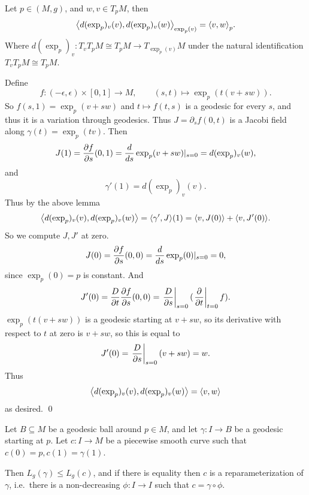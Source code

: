     Let $p\in(M,g)$, and $w,v\in T_pM$, then
    $$ \mathopen{}\mathclose{\left<d(\exp_p)_v(v),d(\exp_p)_v(w)\right>}_{\exp_p(v)} = \mathopen{}\mathclose{\left<v,w\right>}_p . $$
    Where $d(\exp_p)_v\colon T_vT_pM\cong T_pM\to T_{\exp_p(v)}M$ under the natural identification $T_vT_pM\cong T_pM$.

\elemm

\bproof

    Define
    $$ f\colon(-\epsilon,\epsilon)\times[0,1] \to M,\qquad (s,t)\mapsto\exp_p(t(v+sw)) . $$
    So $f(s,1)=\exp_p(v+sw)$ and $t\mapsto f(t,s)$ is a geodesic for every $s$, and thus it is a variation through geodesics.
    Thus $J=\partial_sf(0,t)$ is a Jacobi field along $\gamma(t)=\exp_p(tv)$.
    Then
    $$ J(1) = {{\partial f}\over{\partial s}}(0,1) = {{d}\over{ds}}\exp_p(v+sw)|_{s=0} = d(\exp_p)_v(w) , $$
    and
    $$ \gamma'(1) = d(\exp_p)_v(v) . $$
    Thus by the above lemma
    $$ \mathopen{}\mathclose{\left<d(\exp_p)_v(v),d(\exp_p)_v(w)\right>} = \mathopen{}\mathclose{\left<\gamma',J\right>}(1) = \mathopen{}\mathclose{\left<v,J(0)\right>} + \mathopen{}\mathclose{\left<v,J'(0)\right>} . $$
    So we compute $J,J'$ at zero.
    $$ J(0) = {{\partial f}\over{\partial s}}(0,0) = {{d}\over{ds}}\exp_p(0)|_{s=0} = 0 , $$
    since $\exp_p(0)=p$ is constant.
    And
    $$ J'(0) = {{D}\over{\partial t}}{{\partial f}\over{\partial s}}(0,0) = \left.{{D}\over{\partial s}}\right|_{s=0}(\left.{{\partial }\over{\partial t}}\right|_{t=0}f) . $$
    $\exp_p(t(v+sw))$ is a geodesic starting at $v+sw$, so its derivative with respect to $t$ at zero is $v+sw$, so this
    is equal to
    $$ J'(0) = \left.{{D}\over{\partial s}}\right|_{s=0}(v+sw) = w . $$
    Thus
    $$ \mathopen{}\mathclose{\left<d(\exp_p)_v(v),d(\exp_p)_v(w)\right>} = \mathopen{}\mathclose{\left<v,w\right>} $$
    as desired.
    \qed

\eproof

\bthrm

    Let $B\subseteq M$ be a geodesic ball around $p\in M$, and let $\gamma\colon I\to B$ be a geodesic starting at $p$.
    Let $c\colon I\to M$ be a piecewise smooth curve such that $c(0)=p,c(1)=\gamma(1)$.

    Then $L_g(\gamma)\leq L_g(c)$, and if there is equality then $c$ is a reparameterization of $\gamma$, i.e.\ there is a
    non-decreasing $\phi\colon I\to I$ such that $c=\gamma\circ\phi$.

\ethrm

\bproof

